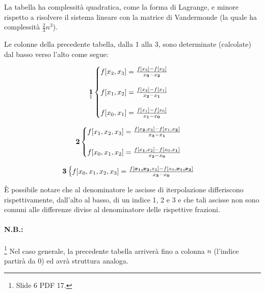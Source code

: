 \begin{example}
	La tabella ha complessità quadratica, come la forma di Lagrange, e minore rispetto a risolvere il sistema lineare con la matrice di Vandermonde (la quale ha complessità $\frac{2}{3}n^3$).
	
	Le colonne della precedente tabella, dalla 1 alla 3, sono determinate (calcolate) dal basso verso l'alto come segue:
	
	\begin{equation*}
		\begin{matrix}
			\underset{\footnotemark}{\boldsymbol 1}
			\begin{cases}
				f[x_2,x_3]=\frac{f[x_3]-f[x_2]}{x_{\boldsymbol 3}-x_{\boldsymbol 2}}\\\\
				f[x_1,x_2]=\frac{f[x_2]-f[x_1]}{x_{\boldsymbol 2}-x_{\boldsymbol 1}}\\\\
				f[x_0,x_1]=\frac{f[x_1]-f[x_0]}{x_{\boldsymbol 1}-x_{\boldsymbol 0}}
			\end{cases}\\\\
			\boldsymbol{2}\begin{cases}
				f[x_1,x_2,x_3]=\frac{f[x_{\boldsymbol 2},x_3]-f[x_1,x_{\boldsymbol 2}]}{x_{\boldsymbol 3}-x_{\boldsymbol 1}}\\\\
				f[x_0,x_1,x_2]=\frac{f[x_{\boldsymbol 1},x_2]-f[x_0,x_{\boldsymbol 1}]}{x_{\boldsymbol 2}-x_{\boldsymbol 0}}
			\end{cases}\\\\
			\boldsymbol{3}\begin{cases}
				f[x_0,x_1,x_2,x_3]=\frac{f[\boldsymbol{x_1,x_2},x_3]-f[x_0,\boldsymbol{x_1,x_2}]}{x_{\boldsymbol 3}-x_{\boldsymbol 0}}
			\end{cases}
		\end{matrix}
	\end{equation*}
	
	È possibile notare che al denominatore le ascisse di iterpolazione differiscono rispettivamente, dall'alto al basso, di un indice 1, 2 e 3 e che tali ascisse non sono comuni alle differenze divise al denominatore delle rispettive frazioni.
	
	\paragraph{N.B.:}\footnote{Slide 6 PDF 17.} Nel caso generale, la precedente tabella arriverà fino a colonna $n$ (l'indice partirà da 0) ed avrà struttura analoga.
\end{example} 

